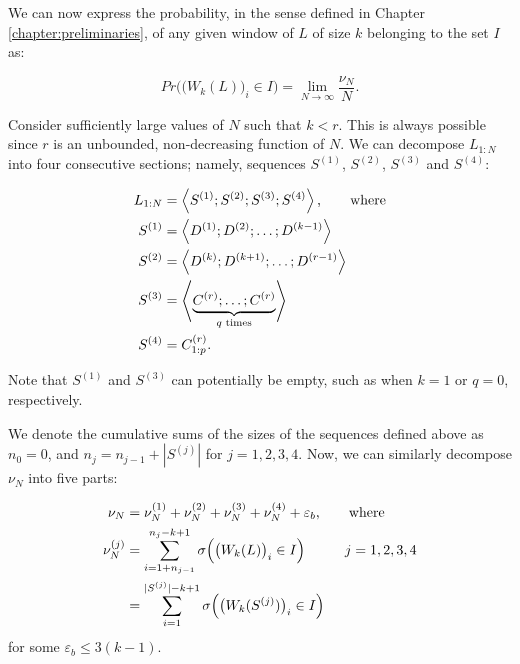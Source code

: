 \documentclass[11pt,a4paper]{tesis}
\theoremstyle{plain}
\theoremstyle{definition}
\begin{document}
We can now express the probability, in the sense defined in Chapter \ref{chapter:preliminaries}, of any given window of $L$ of size $k$ belonging to the set $I$ as:

\begin{equation*}
  Pr\Big( \big( W_k(L) \big)_i \in I \Big) = \lim_{N \to \infty} \frac{\nu_N}{N} \text{.}
\end{equation*}

Consider sufficiently large values of $N$ such that $k < r$. This is always possible since $r$ is an unbounded, non-decreasing function of $N$. We can decompose $L_{1:N}$ into four consecutive sections; namely, sequences $S^{(1)}$, $S^{(2)}$, $S^{(3)}$ and $S^{(4)}$:

\begin{equation*}
  \begin{aligned}
    L_{1:N} & = \left< S^{(1)} ; S^{(2)} ; S^{(3)} ; S^{(4)} \right> \text{, \hspace*{5mm} where} \\
    S^{(1)} & = \left< D^{(1)} ; D^{(2)} ; \dots ; D^{(k - 1)} \right> \\
    S^{(2)} & = \left< D^{(k)} ; D^{(k + 1)} ; \dots ; D^{(r - 1)} \right> \\
    S^{(3)} & = \left< \underbrace{C^{(r)} ; \dots ; C^{(r)}}_{q \text{ times}} \right> \\ 
    S^{(4)} & = C^{(r)}_{1:p} \text{.}
  \end{aligned}
\end{equation*}

Note that $S^{(1)}$ and $S^{(3)}$ can potentially be empty, such as when $k = 1$ or $q = 0$, respectively.

We denote the cumulative sums of the sizes of the sequences defined above as $n_0 = 0$, and $n_j = n_{j - 1} + |S^{(j)}|$ for $j = 1, 2, 3, 4$. Now, we can similarly decompose $\nu_N$ into five parts:

\begin{equation}\label{equation:nu-n-split-five-parts}
  \begin{aligned}
    \nu_N & = \nu^{(1)}_N + \nu^{(2)}_N + \nu^{(3)}_N + \nu^{(4)}_N + \varepsilon_b \text{, \hspace*{5mm} where} \\
    \nu^{(j)}_N & = \sum_{i = 1 + n_{j - 1}}^{n_j - k + 1} \sigma\Big( \big( W_k(L) \big)_i \in I \Big) \text{\hspace*{10mm}} j = 1, 2, 3, 4 \\
                & = \sum_{i = 1}^{|S^{(j)}| - k + 1} \sigma\Big( \big( W_k(S^{(j)}) \big)_i \in I \Big)
  \end{aligned}
\end{equation}
for some $\varepsilon_b \le 3 (k - 1)$.
\end{document}
